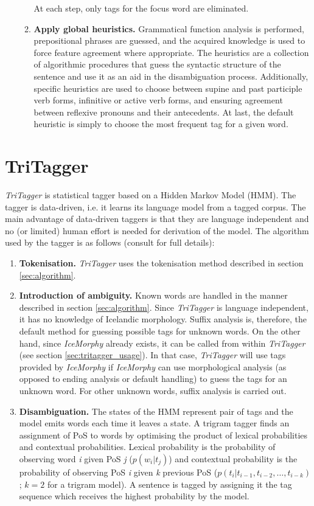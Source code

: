 \documentclass[11pt]{article}
\begin{document}
\begin{enumerate}
\begin{enumerate}
At each step, only tags for the focus word are eliminated.
\item {\bf Apply global heuristics.}
Grammatical function analysis is performed, prepositional phrases are guessed, and the acquired knowledge is used to force feature agreement where appropriate. The heuristics are a collection of algorithmic procedures that guess the syntactic structure of the sentence and use it as an aid in the disambiguation process.
Additionally, specific heuristics are used to choose between supine and past participle verb forms, infinitive or active verb forms, and ensuring agreement between reflexive pronouns and their antecedents.
At last, the default heuristic is simply to choose the most frequent tag for a given word.
\end{enumerate}
\end{enumerate}

\section{TriTagger}
\emph{TriTagger} is statistical tagger based on a Hidden Markov Model (HMM).
The tagger is data-driven, i.e. it learns its language model from a tagged corpus.
The main advantage of data-driven taggers is that they are language independent and no (or limited) human effort is needed for derivation of the model.
The algorithm used by the tagger is as follows (consult \citep{bra00} for full details):

\begin{enumerate}
\item {\bf Tokenisation.}
\emph{TriTagger} uses the tokenisation method described in section \ref{sec:algorithm}.
\item {\bf Introduction of ambiguity.}
Known words are handled in the manner described in section \ref{sec:algorithm}.
Since \emph{TriTagger} is language independent, it has no knowledge of Icelandic morphology.
Suffix analysis is, therefore, the default method for guessing possible tags for unknown words.
On the other hand, since \emph{IceMorphy} already exists, it can be called from within \emph{TriTagger} (see section \ref{sec:tritagger_usage}).
In that case, \emph{TriTagger} will use tags provided by \emph{IceMorphy} if \emph{IceMorphy} can use morphological analysis (as opposed to ending analysis or default handling) to guess the tags for an unknown word.
For other unknown words, suffix analysis is carried out.
\item {\bf Disambiguation.}
The states of the HMM represent pair of tags and the model emits words each time it leaves a state. A trigram tagger finds an assignment of PoS to words by optimising the product of lexical probabilities and contextual probabilities.
Lexical probability is the probability of observing word \emph{i} given PoS \emph{j} ($p(w_{i}|t_{j})$) and contextual probability is the probability of observing PoS \emph{i} given \emph{k} previous PoS ($p(t_{i}|t_{i-1},t_{i-2}, \ldots ,t_{i-k})$; $k=2$ for a trigram model).
A sentence is tagged by assigning it the tag sequence which receives the highest probability by the model.
\end{enumerate}
\end{document}
